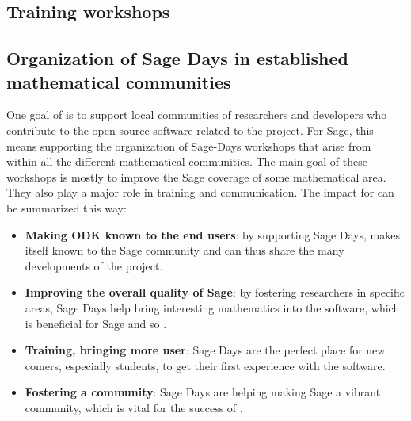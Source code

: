 \documentclass{deliverablereport}
\begin{document}
\subsection{Training workshops}













\subsection{Organization of Sage Days in established mathematical communities}

One goal of \ODK is to support local communities of researchers
and developers who contribute to the open-source software related to
the project. For Sage, this means supporting the organization of Sage-Days
workshops that arise from within all the different mathematical communities. The main 
goal of these workshops is mostly to improve the Sage coverage of some mathematical
area. They also play a major role in training and communication. The
impact for \ODK can be summarized this way:

\begin{itemize}
\item \textbf{Making ODK known to the end users}: by supporting Sage Days,
\ODK makes itself known to the Sage community and can
thus share the many developments of the project.

\item \textbf{Improving the overall quality of Sage}: by fostering researchers
in specific areas, Sage Days help bring interesting mathematics into
the software, which is beneficial for Sage and so \ODK.

\item \textbf{Training, bringing more user}: Sage Days are the perfect place
for new comers, especially students, to get their first experience with the software.

\item \textbf{Fostering a community}: Sage Days are helping making Sage a vibrant
community, which is vital for the success of \ODK.
\end{itemize}
\end{document}
